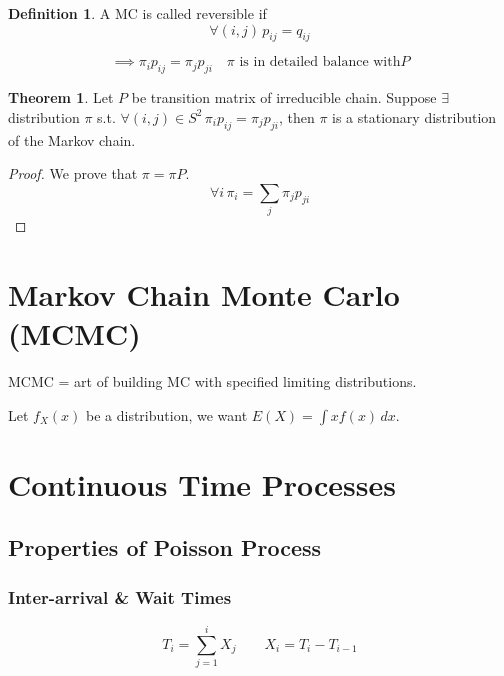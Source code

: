 \documentclass{article}
\theoremstyle{definition}
\newtheorem{defn}{Definition}[section]
\newtheorem{theorem}{Theorem}[section]
\begin{document}
\begin{defn}
A MC is called reversible if 
$$
\forall (i,j) \, p_{ij} = q_{ij}
$$
\end{defn}

$$
\implies \pi_i p_{ij} = \pi_j p_{ji} \quad \pi \text{ is in detailed balance with} P
$$

\begin{theorem}
Let $P$ be transition matrix of irreducible chain. Suppose $\exists$ distribution $\pi$ s.t. $\forall (i,j) \in S^2 \, \pi_i p_{ij} = \pi_j p_{ji}$,
then $\pi$ is a stationary distribution of the Markov chain. 

\begin{proof}
We prove that $\pi = \pi P$. 
$$
\forall i \, \pi_i = \sum_j \pi_j p_{ji}
$$

\end{proof}
\end{theorem}

\section{Markov Chain Monte Carlo (MCMC)}
MCMC = art of building MC with specified limiting distributions.

Let $f_X(x)$ be a distribution, we want $E(X) = \int x f(x) \, dx$. 

\section{Continuous Time Processes}

\subsection{Properties of Poisson Process}

\subsubsection{Inter-arrival \& Wait Times}

$$
T_i = \sum_{j=1}^i X_j \qquad X_i = T_i - T_{i-1}
$$
\end{document}
